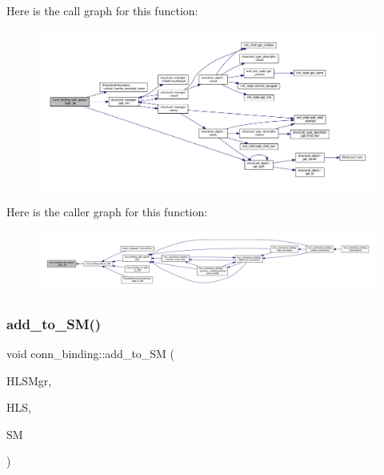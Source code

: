 Here is the call graph for this function\+:
\nopagebreak
\begin{figure}[H]
\begin{center}
\leavevmode
\includegraphics[width=350pt]{d2/db1/classconn__binding_a393ed99302e52c270d5756f789f2fc76_cgraph}
\end{center}
\end{figure}
Here is the caller graph for this function\+:
\nopagebreak
\begin{figure}[H]
\begin{center}
\leavevmode
\includegraphics[width=350pt]{d2/db1/classconn__binding_a393ed99302e52c270d5756f789f2fc76_icgraph}
\end{center}
\end{figure}
\mbox{\label{classconn__binding_aaf898285e246aa69fd49c271cfb8b0bc}} 
\subsubsection{\texorpdfstring{add\+\_\+to\+\_\+\+S\+M()}{add\_to\_SM()}}
{\footnotesize\ttfamily void conn\+\_\+binding\+::add\+\_\+to\+\_\+\+SM (\begin{DoxyParamCaption}\item[{const \hyperlink{hls__manager_8hpp_acd3842b8589fe52c08fc0b2fcc813bfe}{H\+L\+S\+\_\+manager\+Ref}}]{H\+L\+S\+Mgr,  }\item[{const \hyperlink{hls_8hpp_a75d0c73923d0ddfa28c4843a802c73a7}{hls\+Ref}}]{H\+LS,  }\item[{const \hyperlink{structural__manager_8hpp_ab3136f0e785d8535f8d252a7b53db5b5}{structural\+\_\+manager\+Ref}}]{SM }\end{DoxyParamCaption})\hspace{0.3cm}{\ttfamily [virtual]}}



